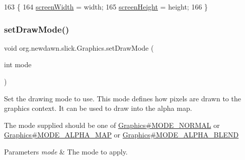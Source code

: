 \begin{DoxyCode}
163                                               \{
164         \mbox{\hyperlink{classorg_1_1newdawn_1_1slick_1_1_graphics_adbb4b10050a8bcf8e496130509784f71}{screenWidth}} = width;
165         \mbox{\hyperlink{classorg_1_1newdawn_1_1slick_1_1_graphics_a24cd14275ad2dcd82fcd843ceab6a80b}{screenHeight}} = height;
166     \}
\end{DoxyCode}
\mbox{\label{classorg_1_1newdawn_1_1slick_1_1_graphics_a468e2501a15587e800ece5535eb72069}} 
\subsubsection{\texorpdfstring{set\+Draw\+Mode()}{setDrawMode()}}
{\footnotesize\ttfamily void org.\+newdawn.\+slick.\+Graphics.\+set\+Draw\+Mode (\begin{DoxyParamCaption}\item[{int}]{mode }\end{DoxyParamCaption})\hspace{0.3cm}{\ttfamily [inline]}}

Set the drawing mode to use. This mode defines how pixels are drawn to the graphics context. It can be used to draw into the alpha map.

The mode supplied should be one of \mbox{\hyperlink{classorg_1_1newdawn_1_1slick_1_1_graphics_a6c86775094fb5d410585e92692c35599}{Graphics\#\+M\+O\+D\+E\+\_\+\+N\+O\+R\+M\+AL}} or \mbox{\hyperlink{classorg_1_1newdawn_1_1slick_1_1_graphics_a5b49f0f7eba96853f6a1e337ff44fb0e}{Graphics\#\+M\+O\+D\+E\+\_\+\+A\+L\+P\+H\+A\+\_\+\+M\+AP}} or \mbox{\hyperlink{classorg_1_1newdawn_1_1slick_1_1_graphics_a02782fadf540222d2928c940ea4f70a4}{Graphics\#\+M\+O\+D\+E\+\_\+\+A\+L\+P\+H\+A\+\_\+\+B\+L\+E\+ND}}


\begin{DoxyParams}{Parameters}
{\em mode} & The mode to apply. \\
\hline
\end{DoxyParams}

